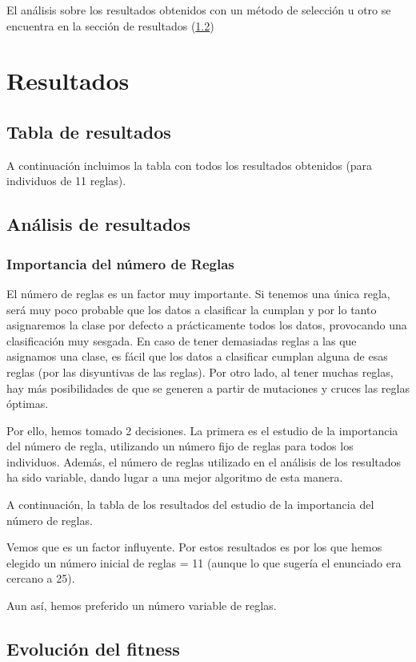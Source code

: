 \documentclass[nochap]{apuntes}
\begin{document}
El análisis sobre los resultados obtenidos con un método de selección u otro se encuentra en la sección de resultados (\ref{sec:Resultados}) 


\chapter{Resultados}
\section{Tabla de resultados}

A continuación incluimos la tabla con todos los resultados obtenidos (para individuos de 11 reglas).





\section{Análisis de resultados}
\label{sec:Resultados}

\subsection{Importancia del número de Reglas}
\label{subsec:numReglas}

El número de reglas es un factor muy importante. Si tenemos una única regla, será muy poco probable que los datos a clasificar la cumplan y por lo tanto asignaremos la clase por defecto a prácticamente todos los datos, provocando una clasificación muy sesgada. En caso de tener demasiadas reglas a las que asignamos una clase, es fácil que los datos a clasificar cumplan alguna de esas reglas (por las disyuntivas de las reglas). Por otro lado, al tener muchas reglas, hay más posibilidades de que se generen a partir de mutaciones y cruces las reglas óptimas.

Por ello, hemos tomado 2 decisiones. La primera es el estudio de la importancia del número de regla, utilizando un número fijo de reglas para todos los individuos. Además, el número de reglas utilizado en el análisis de los resultados ha sido variable,  dando lugar a una mejor algoritmo de esta manera.

A continuación, la tabla de los resultados del estudio de la importancia del número de reglas.



Vemos que es un factor influyente. Por estos resultados es por los que hemos elegido un número inicial de reglas = 11 (aunque lo que sugería el enunciado era cercano a 25).

Aun así, hemos preferido un número variable de reglas. 

\section{Evolución del fitness}
\end{document}
